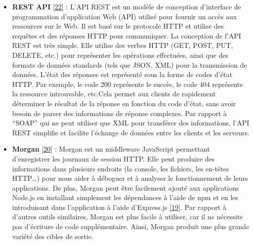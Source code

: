 \documentclass[12pt]{article}
\begin{document}
      \begin{itemize}
            \item
                  \textbf{REST API} \protect\hyperlink{ref-PC3R}{{[}22{]}} : L'API REST
                  est un modèle de conception d'interface de programmation d'application
                  Web (API) utilisé pour fournir un accès aux ressources sur le Web. Il
                  est basé sur le protocole HTTP et utilise des requêtes et des réponses
                  HTTP pour communiquer. \newline  La conception de l'API REST est très
                  simple. Elle utilise des verbes HTTP (GET, POST, PUT, DELETE, etc.)
                  pour représenter les opérations effectuées, ainsi que des formats de
                  données standards (tels que JSON, XML) pour la transmission de
                  données. L'état des réponses est représenté sous la forme de codes
                  d'état HTTP. Par exemple, le code 200 représente le succès, le code
                  404 représente la ressource introuvable, etc.\newline  Cela permet aux
                  clients de rapidement déterminer le résultat de la réponse en fonction
                  du code d'état, sans avoir besoin de parser des informations de
                  réponse complexes. Par rapport à ``SOAP'' qui ne peut utiliser que XML
                  pour transférer des informations, l'API REST simplifie et facilite
                  l'échange de données entre les clients et les serveurs.
            \item
                  \textbf{Morgan} \protect\hyperlink{ref-morgan}{{[}20{]}} : Morgan est
                  un middleware JavaScript permettant d'enregistrer les journaux de
                  session HTTP. Elle peut produire des informations dans plusieurs
                  endroits (la console, les fichiers, les en-têtes HTTP\ldots) pour nous
                  aider à déboguer et à analyser le fonctionnement de leurs
                  applications. De plus, Morgan peut être facilement ajouté aux
                  applications Node.js en installant simplement les dépendances à l'aide
                  de npm et en les introduisant dans l'application à l'aide d'Express.js
                  \protect\hyperlink{ref-Express_js}{{[}19{]}}. Par rapport à d'autres
                  outils similaires, Morgan est plus facile à utiliser, car il ne
                  nécessite pas d'écriture de code supplémentaire. Ainsi, Morgan produit
                  une plus grande variété des cibles de sortie.

\end{itemize}
\end{document}
